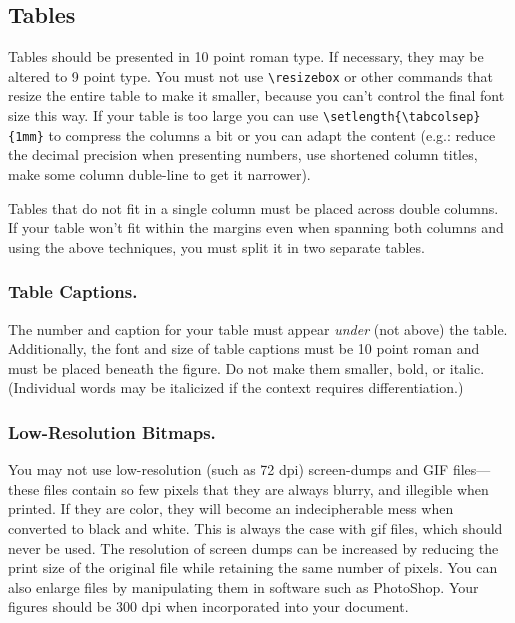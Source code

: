 \subsection{Tables}

Tables should be presented in 10 point roman type. If necessary, they
may be altered to 9 point type. You must not use
\texttt{\textbackslash resizebox} or other commands that resize the
entire table to make it smaller, because you can't control the final
font size this way. If your table is too large you can use
\texttt{\textbackslash setlength\{\textbackslash tabcolsep\}\{1mm\}} to
compress the columns a bit or you can adapt the content (e.g.: reduce
the decimal precision when presenting numbers, use shortened column
titles, make some column duble-line to get it narrower).

Tables that do not fit in a single column must be placed across double
columns. If your table won't fit within the margins even when spanning
both columns and using the above techniques, you must split it in two
separate tables.

\subsubsection {Table Captions.}

The number and caption for your table must appear \textit{under} (not
above) the table. Additionally, the font and size of table captions must
be 10 point roman and must be placed beneath the figure. Do not make
them smaller, bold, or italic. (Individual words may be italicized if
the context requires differentiation.)

\subsubsection{Low-Resolution Bitmaps.}

You may not use low-resolution (such as 72 dpi) screen-dumps and GIF
files---these files contain so few pixels that they are always blurry,
and illegible when printed. If they are color, they will become an
indecipherable mess when converted to black and white. This is always
the case with gif files, which should never be used. The resolution of
screen dumps can be increased by reducing the print size of the original
file while retaining the same number of pixels. You can also enlarge
files by manipulating them in software such as PhotoShop. Your figures
should be 300 dpi when incorporated into your document.

